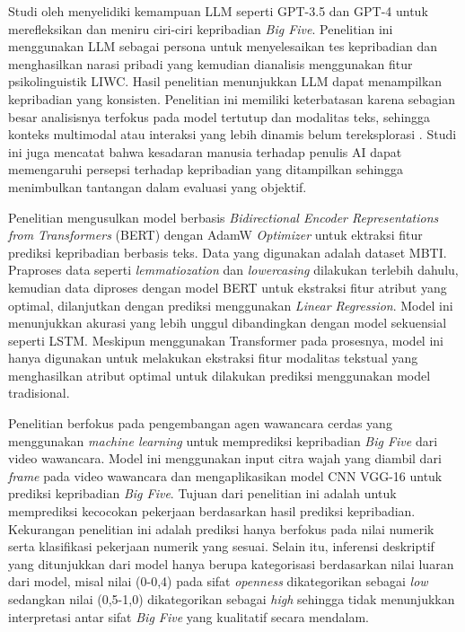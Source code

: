 Studi oleh \textcite{Jiang2024} menyelidiki kemampuan LLM seperti GPT-3.5 dan GPT-4 untuk merefleksikan dan meniru ciri-ciri kepribadian \textit{Big Five}. Penelitian ini menggunakan LLM sebagai persona untuk menyelesaikan tes kepribadian dan menghasilkan narasi pribadi yang kemudian dianalisis menggunakan fitur psikolinguistik LIWC. Hasil penelitian menunjukkan LLM dapat menampilkan kepribadian yang konsisten. Penelitian ini memiliki keterbatasan karena sebagian besar analisisnya terfokus pada model tertutup dan modalitas teks, sehingga konteks multimodal atau interaksi yang lebih dinamis belum tereksplorasi \parencite{Tseng2024}. Studi ini juga mencatat bahwa kesadaran manusia terhadap penulis AI dapat memengaruhi persepsi terhadap kepribadian yang ditampilkan sehingga menimbulkan tantangan dalam evaluasi yang objektif.

Penelitian \textcite{Devi2024} mengusulkan model berbasis \textit{Bidirectional Encoder Representations from Transformers} (BERT) dengan AdamW \textit{Optimizer} untuk ektraksi fitur prediksi kepribadian berbasis teks. Data yang digunakan adalah dataset MBTI. Praproses data seperti \textit{lemmatiozation} dan \textit{lowercasing} dilakukan terlebih dahulu, kemudian data diproses dengan model BERT untuk ekstraksi fitur atribut yang optimal, dilanjutkan dengan prediksi menggunakan \textit{Linear Regression}. Model ini menunjukkan akurasi yang lebih unggul dibandingkan dengan model sekuensial seperti LSTM. Meskipun menggunakan Transformer pada prosesnya, model ini hanya digunakan untuk melakukan ekstraksi fitur modalitas tekstual yang menghasilkan atribut optimal untuk dilakukan prediksi menggunakan model tradisional.

Penelitian \textcite{Mandakini2023} berfokus pada pengembangan agen wawancara cerdas yang menggunakan \textit{machine learning} untuk memprediksi kepribadian \textit{Big Five} dari video wawancara. Model ini menggunakan input citra wajah yang diambil dari \textit{frame} pada video wawancara dan mengaplikasikan model CNN VGG-16 untuk prediksi kepribadian \textit{Big Five}. Tujuan dari penelitian ini adalah untuk memprediksi kecocokan pekerjaan berdasarkan hasil prediksi kepribadian. Kekurangan penelitian ini adalah prediksi hanya berfokus pada nilai numerik serta klasifikasi pekerjaan numerik yang sesuai. Selain itu, inferensi deskriptif yang ditunjukkan dari model hanya berupa kategorisasi berdasarkan nilai luaran dari model, misal nilai (0-0,4) pada sifat \textit{openness} dikategorikan sebagai \textit{low} sedangkan nilai (0,5-1,0) dikategorikan sebagai \textit{high} sehingga tidak menunjukkan interpretasi antar sifat \textit{Big Five} yang kualitatif secara mendalam.


